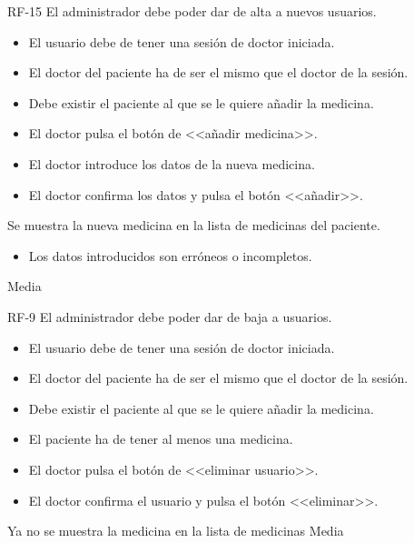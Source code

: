 {RF-15}
{El administrador debe poder dar de alta a nuevos usuarios.}
{	\begin{itemize}
	\def\labelenumi{\arabic{enumi}.}
	\tightlist
	\item El usuario debe de tener una sesión de doctor iniciada.
	\item El doctor del paciente ha de ser el mismo que el doctor de la sesión.
	\item Debe existir el paciente al que se le quiere añadir la medicina.
	\end{itemize}}
{
	\begin{itemize}
	\def\labelenumi{\arabic{enumi}.}
	\tightlist

    \item El doctor pulsa el botón de <<añadir medicina>>.
    \item El doctor introduce los datos de la nueva medicina.
    \item El doctor confirma los datos y pulsa el botón <<añadir>>.
    \end{itemize}
}
{Se muestra la nueva medicina en la lista de medicinas del paciente.}
{\begin{itemize}
	\def\labelenumi{\arabic{enumi}.}
	\tightlist
    \item Los datos introducidos son erróneos o incompletos.
    \end{itemize}}
{Media}

{RF-9}
{El administrador debe poder dar de baja a usuarios.}
{	\begin{itemize}
	\def\labelenumi{\arabic{enumi}.}
	\tightlist
	\item El usuario debe de tener una sesión de doctor iniciada.
	\item El doctor del paciente ha de ser el mismo que el doctor de la sesión.
	\item Debe existir el paciente al que se le quiere añadir la medicina.
	\item El paciente ha de tener al menos una medicina.
	\end{itemize}}
{
	\begin{itemize}
	\def\labelenumi{\arabic{enumi}.}
	\tightlist
    \item El doctor pulsa el botón de <<eliminar usuario>>.
    \item El doctor confirma el usuario y pulsa el botón <<eliminar>>.
    \end{itemize}
}
{Ya no se muestra la medicina en la lista de medicinas}
{}
{Media}


